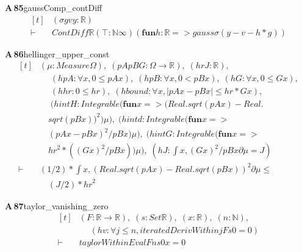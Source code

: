 \documentclass[conference]{IEEEtran}
\theoremstyle{definition}
\newcommand{\lean}[1]{\textsf{\footnotesize #1}}
\begin{document}
\noindent\textbf{A\,85}\quad\lean{gaussComp\_contDiff}
{\footnotesize\[ \begin{aligned}[t]
&(\sigma \mathit{g} \mathit{v} \mathit{y} : \mathbb{R} )\\
\vdash\;&\mathit{ContDiff} \mathbb{R} (⊤ : \mathbb{N} \infty ) (\mathbf{fun} \mathit{h} : \mathbb{R} => \mathit{gauss} \sigma (\mathit{y} - \mathit{v} - \mathit{h} * \mathit{g}))
\end{aligned} \]}

\noindent\textbf{A\,86}\quad\lean{hellinger\_upper\_const}
{\footnotesize\[ \begin{aligned}[t]
&(\mu : \mathit{Measure} \Omega ),\; (\mathit{pA} \mathit{pB} \mathit{G} : \Omega \to \mathbb{R} ),\; (\mathit{hr} \mathit{J} : \mathbb{R} ),\\
&\quad \; (\mathit{hpA} : \forall \mathit{x}, 0 \leq \mathit{pA} \mathit{x}),\; (\mathit{hpB} : \forall \mathit{x}, 0 < \mathit{pB} \mathit{x}),\; (\mathit{hG} : \forall \mathit{x}, 0 \leq \mathit{G} \mathit{x}),\\
&\quad \; (\mathit{hhr} : 0 \leq \mathit{hr}),\; (\mathit{hbound} : \forall \mathit{x}, |\mathit{pA} \mathit{x} - \mathit{pB} \mathit{x}| \leq \mathit{hr} * \mathit{G} \mathit{x}),\\
&\quad \; (\mathit{hintH} : \mathit{Integrable} (\mathbf{fun} \mathit{x} => (\mathit{Real}.\mathit{sqrt} (\mathit{pA} \mathit{x}) - \mathit{Real}.\\
&\quad \mathit{sqrt} (\mathit{pB} \mathit{x})) ^{2}) \mu ),\; (\mathit{hintd} : \mathit{Integrable} (\mathbf{fun} \mathit{x} =>\\
&\quad (\mathit{pA} \mathit{x} - \mathit{pB} \mathit{x}) ^{2} / \mathit{pB} \mathit{x}) \mu ),\; (\mathit{hintG} : \mathit{Integrable} (\mathbf{fun} \mathit{x} =>\\
&\quad \mathit{hr} ^{2} * ((\mathit{G} \mathit{x}) ^{2} / \mathit{pB} \mathit{x})) \mu ),\; (\mathit{hJ} : \int \mathit{x}, (\mathit{G} \mathit{x}) ^{2} / \mathit{pB} \mathit{x} ∂\mu = \mathit{J})\\
\vdash\;&(1 / 2) * \int \mathit{x}, (\mathit{Real}.\mathit{sqrt} (\mathit{pA} \mathit{x}) - \mathit{Real}.\mathit{sqrt} (\mathit{pB} \mathit{x})) ^{2} ∂\mu \leq\\
&\quad (\mathit{J} / 2) * \mathit{hr} ^{2}
\end{aligned} \]}

\noindent\textbf{A\,87}\quad\lean{taylor\_vanishing\_zero}
{\footnotesize\[ \begin{aligned}[t]
&(\mathit{F} : \mathbb{R} \to \mathbb{R} ),\; (\mathit{s} : \mathit{Set} \mathbb{R} ),\; (\mathit{x} : \mathbb{R} ),\; (\mathit{n} : \mathbb{N} ),\\
&\quad \; (\mathit{hv} : \forall \mathit{j} \leq \mathit{n}, \mathit{iteratedDerivWithin} \mathit{j} \mathit{F} \mathit{s} 0 = 0)\\
\vdash\;&\mathit{taylorWithinEval} \mathit{F} \mathit{n} \mathit{s} 0 \mathit{x} = 0
\end{aligned} \]}
\end{document}
